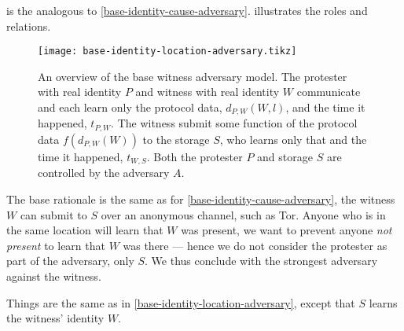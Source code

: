  is the analogous to 
\cref{base-identity-cause-adversary}.
 illustrates the roles and relations.

\begin{figure}
  \centering
  \texttt{[image: base-identity-location-adversary.tikz]}
  \caption{\label{fig:identity-location-adversary}%
    An overview of the base witness adversary model.
    The protester with real identity \(P\) and witness with real identity \(W\) 
    communicate and each learn only the protocol data, \(d_{P,W}(W, l)\), and 
    the time it happened, \(t_{P,W}\).
    The witness submit some function of the protocol data \(f(d_{P,W}(W))\) to 
    the storage \(S\), who learns only that and the time it happened, 
    \(t_{W,S}\).
    Both the protester \(P\) and storage \(S\) are controlled by the adversary 
    \(A\).
  }
\end{figure}

The base rationale is the same as for \cref{base-identity-cause-adversary}, the 
witness \(W\) can submit to \(S\) over an anonymous channel, such as \ac{Tor}.
Anyone who is in the same location will learn that \(W\) was present, we want 
to prevent anyone \emph{not present} to learn that \(W\) was there --- hence we 
do not consider the protester as part of the adversary, only \(S\).
We thus conclude with the strongest adversary against the witness.

\begin{definition}%
  \label{strongest-identity-location-adversary}
  Things are the same as in \cref{base-identity-location-adversary}, except 
  that \(S\) learns the witness' identity \(W\).
\end{definition}
